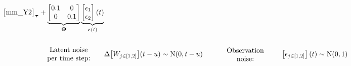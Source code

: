 \documentclass[a4paper]{article}
\newcommand{\vect}[1]{\boldsymbol{\mathbf{#1}}}
\begin{document}
\begin{normalsize}
\begin{align*}
{\begin{bmatrix}
\text{mm\_Y2}
\end{bmatrix} 
        }_{{\vect{\tau}}} + 
              \underbrace{
                \begin{bmatrix}
0.1 & 0\\ 
0 & 0.1
\end{bmatrix}  
              }_{{\vect{\Theta}}}
              \underbrace{
          \begin{bmatrix}
\epsilon_{1}\\ 
\epsilon_{2}
\end{bmatrix} 
          (t)}_{\vect{\epsilon}(t)} \\ \\
                \parbox{10em}{\centering{Latent noise\linebreak per time step:}}
          &\Delta \big[W_{j \in [1,2]}\big](t-u)   \sim  \mathrm{N}(0,t-u) \quad
              \parbox{10em}{\centering{Observation\linebreak noise:}}
            \begin{bmatrix}
\epsilon_{j \in [1,2]}
\end{bmatrix} 
            (t) \sim  \mathrm{N}(0,1) \\ \\
      \end{align*}
      \end{normalsize}
      
\end{document}
